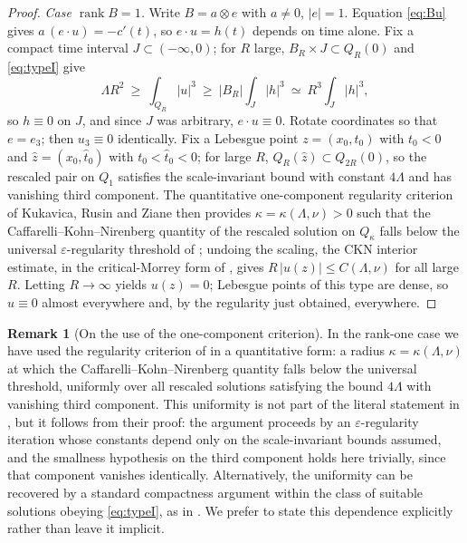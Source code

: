 \documentclass[11pt,reqno]{amsart}
\newcommand{\abs}[1]{\left\lvert #1\right\rvert}
\DeclareMathOperator{\rank}{rank}
\theoremstyle{definition}
\newtheorem{remark}[theorem]{Remark}
\begin{document}
\begin{proof}
\emph{Case $\rank B=1$.} Write $B=a\otimes e$ with $a\ne0$, $\abs e=1$. Equation
\eqref{eq:Bu} gives $a\,(e\cdot u)=-c'(t)$, so $e\cdot u=h(t)$ depends on time alone. Fix a
compact time interval $J\subset(-\infty,0)$; for $R$ large, $B_R\times J\subset Q_R(0)$
and \eqref{eq:typeI} give
\[
  \Lambda R^2\ \ge\ \int_{Q_R}\abs u^3\ \ge\ \abs{B_R}\int_J\abs{h}^3
  \ \simeq\ R^3\int_J\abs h^3 ,
\]
so $h\equiv0$ on $J$, and since $J$ was arbitrary, $e\cdot u\equiv0$. Rotate coordinates so
that $e=e_3$; then $u_3\equiv0$ identically. Fix a Lebesgue point $z=(x_0,t_0)$ with
$t_0<0$ and $\widehat z=(x_0,\widehat t_0)$ with $t_0<\widehat t_0<0$; for large $R$,
$Q_R(\widehat z)\subset Q_{2R}(0)$, so the rescaled pair on $Q_1$ satisfies the
scale-invariant bound with constant $4\Lambda$ and has vanishing third component. The
quantitative one-component regularity criterion of Kukavica, Rusin and Ziane
\cite{KukavicaRusinZiane2017} then provides $\kappa=\kappa(\Lambda,\nu)>0$ such that the
Caffarelli--Kohn--Nirenberg quantity of the rescaled solution on $Q_\kappa$ falls below
the universal $\varepsilon$-regularity threshold of
\cite{CaffarelliKohnNirenberg1982}; undoing the scaling, the CKN interior estimate, in the
critical-Morrey form of \cite{Seregin2006Regularity}, gives
$R\,\abs{u(z)}\le C(\Lambda,\nu)$ for all large $R$. Letting $R\to\infty$ yields $u(z)=0$;
Lebesgue points of this type are dense, so $u\equiv0$ almost everywhere and, by the
regularity just obtained, everywhere.
\end{proof}

\begin{remark}[On the use of the one-component criterion]\label{rem:KRZ}
In the rank-one case we have used the regularity criterion of
\cite{KukavicaRusinZiane2017} in a quantitative form: a radius
$\kappa=\kappa(\Lambda,\nu)$ at which the Caffarelli--Kohn--Nirenberg quantity falls
below the universal threshold, uniformly over all rescaled solutions satisfying the bound
$4\Lambda$ with vanishing third component. This uniformity is not part of the literal
statement in \cite{KukavicaRusinZiane2017}, but it follows from their proof: the argument
proceeds by an $\varepsilon$-regularity iteration whose constants depend only on the
scale-invariant bounds assumed, and the smallness hypothesis on the third component holds
here trivially, since that component vanishes identically. Alternatively, the uniformity
can be recovered by a standard compactness argument within the class of suitable
solutions obeying \eqref{eq:typeI}, as in \cite{AlbrittonBarkerPrange2023}. We prefer to
state this dependence explicitly rather than leave it implicit.
\end{remark}
\end{document}
